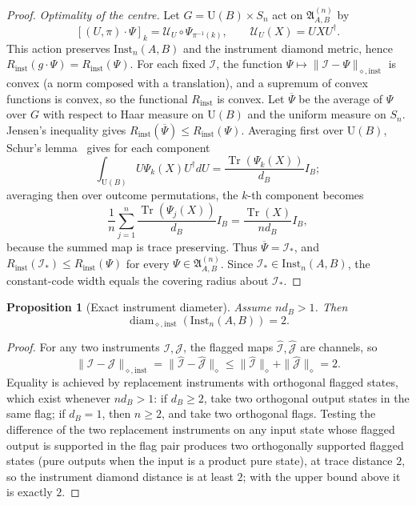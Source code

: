 \documentclass[11pt,a4paper]{article}
\newtheorem{proposition}[theorem]{Proposition}
\newcommand{\Inst}{\mathrm{Inst}}
\newcommand{\Tr}{\operatorname{Tr}}
\newcommand{\diam}{\operatorname{diam}}
\begin{document}
\begin{proof}
\emph{Optimality of the centre.} Let $G=\mathrm U(B)\times S_n$ act on $\mathfrak A_{A,B}^{(n)}$ by
\[
[(U,\pi)\cdot\Psi]_k=\mathcal U_U\circ\Psi_{\pi^{-1}(k)},
\qquad \mathcal U_U(X)=UXU^\dagger.
\]
This action preserves $\Inst_n(A,B)$ and the instrument diamond metric, hence $R_{\mathrm{inst}}(g\cdot\Psi)=R_{\mathrm{inst}}(\Psi)$. For each fixed $\mathcal I$, the function $\Psi\mapsto\|\mathcal I-\Psi\|_{\diamond,\mathrm{inst}}$ is convex (a norm composed with a translation), and a supremum of convex functions is convex, so the functional $R_{\mathrm{inst}}$ is convex. Let $\overline\Psi$ be the average of $\Psi$ over $G$ with respect to Haar measure on $\mathrm U(B)$ and the uniform measure on $S_n$. Jensen's inequality gives $R_{\mathrm{inst}}(\overline\Psi)\le R_{\mathrm{inst}}(\Psi)$. Averaging first over $\mathrm U(B)$, Schur's lemma~\cite{Watrous2018} gives for each component
\[
\int_{\mathrm U(B)}U\Psi_k(X)U^\dagger dU=\frac{\Tr(\Psi_k(X))}{d_B}I_B;
\]
averaging then over outcome permutations, the $k$-th component becomes
\[
\frac1n\sum_{j=1}^n\frac{\Tr(\Psi_j(X))}{d_B}I_B
=\frac{\Tr(X)}{nd_B}I_B,
\]
because the summed map is trace preserving. Thus $\overline\Psi=\mathcal I_*$, and $R_{\mathrm{inst}}(\mathcal I_*)\le R_{\mathrm{inst}}(\Psi)$ for every $\Psi\in\mathfrak A_{A,B}^{(n)}$. Since $\mathcal I_*\in\Inst_n(A,B)$, the constant-code width equals the covering radius about $\mathcal I_*$.
\end{proof}

\begin{proposition}[Exact instrument diameter]
\label{prop:diameter}
Assume $nd_B>1$. Then
\[
\diam_{\diamond,\mathrm{inst}}(\Inst_n(A,B))=2.
\]
\end{proposition}

\begin{proof}
For any two instruments $\mathcal I,\mathcal J$, the flagged maps $\widehat{\mathcal I},\widehat{\mathcal J}$ are channels, so
\[
\|\mathcal I-\mathcal J\|_{\diamond,\mathrm{inst}}
=\|\widehat{\mathcal I}-\widehat{\mathcal J}\|_\diamond
\le\|\widehat{\mathcal I}\|_\diamond+\|\widehat{\mathcal J}\|_\diamond=2.
\]
Equality is achieved by replacement instruments with orthogonal flagged states, which exist whenever $nd_B>1$: if $d_B\ge2$, take two orthogonal output states in the same flag; if $d_B=1$, then $n\ge2$, and take two orthogonal flags. Testing the difference of the two replacement instruments on any input state whose flagged output is supported in the flag pair produces two orthogonally supported flagged states (pure outputs when the input is a product pure state), at trace distance $2$, so the instrument diamond distance is at least $2$; with the upper bound above it is exactly $2$.
\end{proof}
\end{document}
